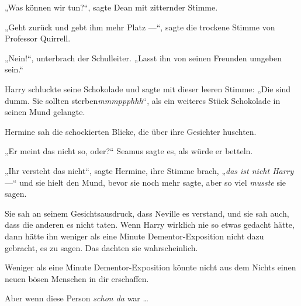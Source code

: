 „Was können wir tun?“, sagte Dean mit zitternder Stimme.

„Geht zurück und gebt ihm mehr Platz —“, sagte die trockene Stimme von Professor Quirrell.

„Nein!“, unterbrach der Schulleiter.
„Lasst ihn von seinen Freunden umgeben sein.“

Harry schluckte seine Schokolade und sagte mit dieser leeren Stimme:
„Die sind dumm. Sie sollten sterben\emph{mmmppphhh}“, als ein weiteres Stück Schokolade in seinen Mund gelangte.

Hermine sah die schockierten Blicke, die über ihre Gesichter huschten.

„Er meint das nicht so, oder?“ Seamus sagte es, als würde er betteln.

„Ihr versteht das nicht“, sagte Hermine, ihre Stimme brach,
„\emph{das ist nicht Harry} —“ und sie hielt den Mund, bevor sie noch mehr sagte, aber so viel \emph{musste} sie sagen.

Sie sah an seinem Gesichtsausdruck, dass Neville es verstand, und sie sah auch, dass die anderen es nicht taten. Wenn Harry wirklich nie so etwas gedacht hätte, dann hätte ihn weniger als eine Minute Dementor-Exposition nicht dazu gebracht, es zu sagen. Das dachten sie wahrscheinlich.

Weniger als eine Minute Dementor-Exposition könnte nicht aus dem Nichts einen neuen bösen Menschen in dir erschaffen.

Aber wenn diese Person \emph{schon da} war …


